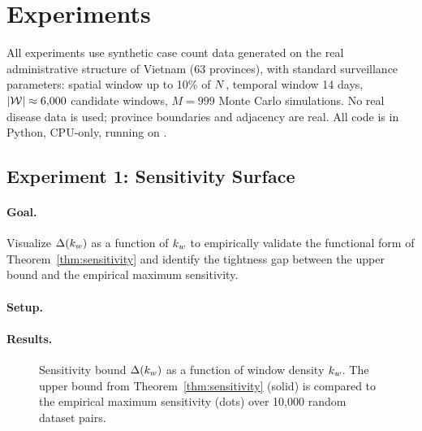 
\section{Experiments}
\label{sec:experiments}

All experiments use synthetic case count data generated on the real administrative
structure of Vietnam (63 provinces), with standard surveillance parameters:
spatial window up to 10\% of $N$, temporal window 14 days,
$|\mathcal{W}| \approx 6{,}000$ candidate windows, $M = 999$ Monte Carlo simulations.
No real disease data is used; province boundaries and adjacency are real.
All code is in Python, CPU-only, running on .


\subsection{Experiment 1: Sensitivity Surface}
\label{sec:exp1}

\paragraph{Goal.}
Visualize $\Delta(k_w)$ as a function of $k_w$ to empirically validate the functional
form of Theorem~\ref{thm:sensitivity} and identify the tightness gap between the
upper bound and the empirical maximum sensitivity.

\paragraph{Setup.}

\paragraph{Results.}

\begin{figure}[ht]
    \centering
    \caption{Sensitivity bound $\Delta(k_w)$ as a function of window density $k_w$.
             The upper bound from Theorem~\ref{thm:sensitivity} (solid) is compared to
             the empirical maximum sensitivity (dots) over 10{,}000 random dataset pairs.}
    \label{fig:sensitivity-surface}
\end{figure}

